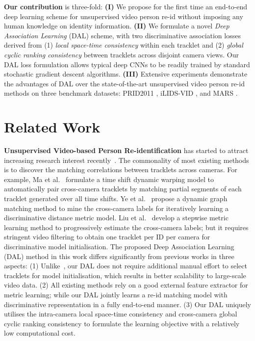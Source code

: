 \documentclass{bmvc2k}
\begin{document}
{\bf Our contribution} is three-fold:
{\bf (I)} We propose for the first time an end-to-end deep learning scheme for unsupervised video person re-id without imposing any human knowledge on identity information. 
{\bf (II)} We formulate a novel {\em Deep Association Learning} (DAL) scheme, 
with two discriminative association losses derived from  
(1) 
{\em local space-time consistency} within each tracklet and (2) 
{\em global cyclic ranking consistency} between tracklets across disjoint camera views.
Our DAL loss formulation allows typical deep CNNs to be readily 
trained by standard stochastic gradient descent algorithms.
{\bf (III)} Extensive experiments demonstrate the advantages of DAL over the state-of-the-art unsupervised video person re-id methods
on three benchmark datasets: PRID2011 \cite{hirzer2011person}, iLIDS-VID \cite{wang2014person}, and MARS \cite{zheng2016mars}. 

\section{Related Work}
{\bf Unsupervised Video-based Person Re-identification} has started to attract increasing research interest recently~\cite{karanam2015person,khan2016unsupervised,ma2017person,ye2017dynamic,liu2017stepwise}. 
The commonality of most existing methods is to discover the matching correlations between tracklets across cameras. 
For example, Ma et al.~\cite{ma2017person} formulate a time shift dynamic warping model to automatically pair cross-camera tracklets by matching partial segments of each tracklet generated over all time shifts. 
Ye et al.~\cite{ye2017dynamic} propose a dynamic graph matching method to mine the cross-camera labels for iteratively learning a discriminative distance metric model. 
Liu et al.~\cite{liu2017stepwise} develop a stepwise metric learning method to progressively estimate the cross-camera labels; but it requires stringent video filtering to obtain 
one tracklet per ID per camera for discriminative model initialisation. 
The proposed Deep Association Learning (DAL) method in this
work differs significantly from previous works in three aspects:  
(1) Unlike~\cite{ma2017person,liu2017stepwise}, our DAL does not require additional manual effort to select tracklets for model initialisation, which results in better scalability to large-scale video data. 
(2) All existing methods rely on a good external feature extractor for metric learning; 
while our DAL jointly learns a re-id matching model with discriminative representation in a fully end-to-end manner. 
(3) Our DAL uniquely utilises the intra-camera  
local space-time consistency and cross-camera global cyclic ranking 
consistency to formulate the learning objective with a relatively low computational cost. 
\end{document}
